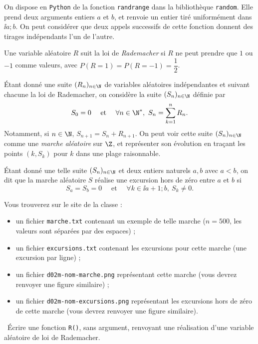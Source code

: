On dispose en \texttt{Python} de la fonction \texttt{randrange} dans la bibliothèque \texttt{random}. 
Elle prend deux  arguments entiers $a$ et $b$, et renvoie un entier tiré uniformément dans $\ii{a;b}$. 
On peut considérer que deux appels successifs de cette fonction donnent des tirages indépendants l'un de l'autre. 

Une variable aléatoire $R$ suit la loi de \emph{Rademacher} si $R$ ne peut prendre que $1$ ou $-1$ comme valeurs, avec $P(R=1)=P(R=-1) = \dfrac{1}{2}$.

Étant donné une suite $(R_n)_{n\in\N}$ de variables aléatoires indépendantes et suivant chacune la loi de Rademacher, on considère la suite $(S_n)_{n\in\N}$ définie par 
\begin{equation*}
  S_0 = 0 \quad\textrm{ et }\quad \forall n \in \N^\ast,~S_{n} = \sum_{k=1}^n R_n.
\end{equation*}
Notamment, si $n\in\N$, $S_{n+1} = S_n + R_{n+1}$. On peut voir cette suite $(S_n)_{n\in\N}$ comme une \emph{marche aléatoire} sur $\Z$, et représenter son évolution en traçant les points $(k,S_k)$ pour $k$ dans une plage raisonnable. 

Étant donné une telle suite  $(S_n)_{n\in\N}$ et deux entiers naturels $a,b$ avec $a<b$, on dit que la marche aléatoire $S$ réalise une excursion hors de zéro entre $a$ et $b$ si 
\begin{equation*}
  S_a = S_b = 0 \quad\textrm{ et }\quad \forall k \in \ii{a+1;b},~ S_k \neq 0.
\end{equation*}

Vous trouverez sur le site de la classe :
\begin{itemize}
  \item un fichier \texttt{marche.txt} contenant un exemple de telle marche ($n=500$, les valeurs sont séparées par des espaces) ;
  \item un fichier \texttt{excursions.txt} contenant les excursions pour cette marche (une excursion par ligne) ; 
  \item un fichier \texttt{d02m-nom-marche.png} représentant cette marche (vous devrez renvoyer une figure similaire) ; 
  \item un fichier \texttt{d02m-nom-excursions.png} représentant les excursions hors de zéro de cette marche (vous devrez renvoyer une figure similaire).
\end{itemize}

\medskip

\question\ Écrire une fonction \texttt{R()}, sans argument, renvoyant une réalisation d'une variable aléatoire de loi de Rademacher. 

